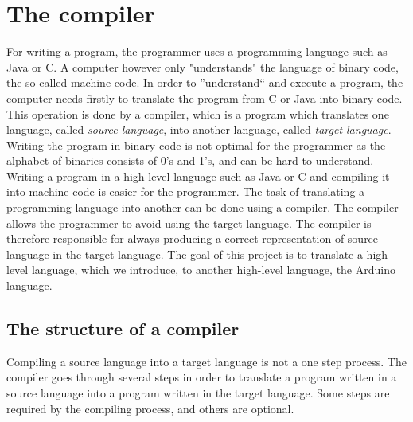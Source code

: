 \chapter{The compiler} \label{chap:the_compiler}
For writing a program, the programmer uses a programming language such as Java or C. A computer however only "understands" the language of binary code, the so called machine code. In order to ''understand`` and execute a program, the computer needs firstly to translate the program from C or Java into binary code. This operation is done by a compiler, which is a program which translates one language, called \textit{source language}, into another language, called \textit{target language}. Writing the program in binary code is not optimal for the programmer as the alphabet of binaries consists of 0's and 1's, and can be hard to understand. Writing a program in a high level language such as Java or C and compiling it into machine code is easier for the programmer. The task of translating a programming language into another can be done using a compiler. The compiler allows the programmer to avoid using the target language. The compiler is therefore responsible for always producing a correct representation of source language in the target language. The goal of this project is to translate a high-level language, which we introduce, to another high-level language, the Arduino language.

\section{The structure of a compiler} 
\label{sec:compiler}
Compiling a source language into a target language is not a one step process. The compiler goes through several steps in order to translate a program written in a source language into a program written in the target language. Some steps are required by the compiling process, and others are optional.

